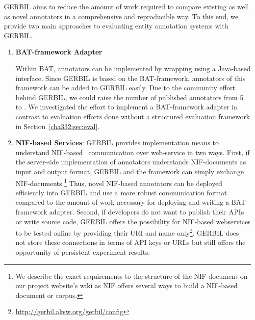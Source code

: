 GERBIL aims to reduce the amount of work required to compare existing as well as novel annotators in a comprehensive and reproducible way. To this end, we provide two main approaches to evaluating entity annotation systems with GERBIL.
\begin{enumerate}
\item \textbf{BAT-framework Adapter}

Within BAT, annotators can be implemented by wrapping using a Java-based interface.
Since GERBIL is based on the BAT-framework, annotators of this framework can be added to GERBIL easily.
Due to the community effort behind GERBIL, we could raise the number of published annotators from 5 to \overallGERBILannotators.
We investigated the effort to implement a BAT-framework adapter in contrast to evaluation efforts done without a structured evaluation framework in Section~\ref{cha332:sec:eval}.

\item \textbf{NIF-based Services}:
GERBIL provides implementation means to understand NIF-based~\cite{NIF} communication over web-service in two ways.
First, if the server-side implementation of annotators understands NIF-documents as input and output format, GERBIL and the framework can simply exchange NIF-documents.\footnote{We describe the exact requirements to the structure of the NIF document on our project website's wiki as NIF offers several ways to build a NIF-based document or corpus.}
Thus, novel NIF-based annotators can be deployed efficiently into GERBIL and use a more robust communication format compared to the amount of work necessary for deploying and writing a BAT-framework adapter.
Second, if developers do not want to publish their APIs or write source code, GERBIL offers the possibility for NIF-based webservices to be tested online by providing their URI and name only\footnote{\url{http://gerbil.aksw.org/gerbil/config}}. 
GERBIL does not store these connections in terms of API keys or URLs but still offers the opportunity of persistent experiment results.
\end{enumerate}

